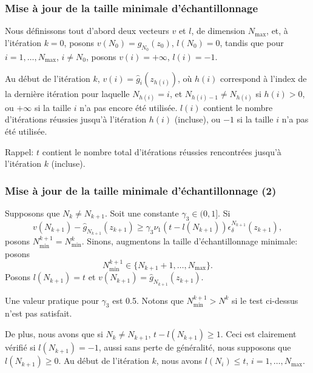 \documentclass[french]{beamer}
\begin{document}
\begin{frame}
\frametitle{Mise à jour de la taille minimale d'échantillonnage}

Nous définissons tout d'abord deux vecteurs $v$ et $l$, de dimension
$N_{\max}$, et, à l'itération $k = 0$, posons $v(N_0) =
\hat{g}_{N_0}(z_0)$, $l(N_0) = 0$, tandis que pour $i =
1,\ldots,N_{\max}$, $i \ne N_0$, posons $v(i) = +\infty$, $l(i) = -1$.

\mbox{}

Au début de l'itération $k$, $v(i) = \hat{g}_i(z_{h(i)})$, où $h(i)$
correspond à l'index de la dernière itération pour laquelle $N_{h(i)} =
i$, et $N_{h(i)-1} \ne N_{h(i)}$ si $h(i) > 0$, ou $+\infty$ si la
taille $i$ n'a pas encore été utilisée.
$l(i)$ contient le nombre d'itérations réussies jusqu'à l'itération
$h(i)$ (incluse), ou $-1$ si la taille $i$ n'a pas été utilisée.

\mbox{}

Rappel: $t$ contient le nombre total d'itérations réussies rencontrées
jusqu'à l'itération $k$ (incluse).

\end{frame}

\begin{frame}
\frametitle{Mise à jour de la taille minimale d'échantillonnage (2)}

Supposons que $N_k \ne N_{k+1}$.
Soit une constante $\gamma_3 \in (0,1]$. Si
\[
v(N_{k+1}) - \hat{g}_{N_{k+1}}(z_{k+1}) \geq
\gamma_3\nu_1(t-l(N_{k+1}))\epsilon_{\delta}^{N_{k+1}}(z_{k+1}),
\]
posons $N_{\min}^{k+1} = N_{\min}^k$.
Sinons, augmentons la taille d'échantillonnage minimale: posons
\[
N^{k+1}_{\min} \in \lbrace N_{k+1}+1,\ldots,N_{\max} \rbrace .
\]
Posons $l(N_{k+1}) = t$ et $v(N_{k+1}) = \hat{g}_{N_{k+1}}(z_{k+1})$.

\mbox{}

Une valeur pratique pour $\gamma_3$ est 0.5.
Notons que $N^{k+1}_{\min} > N^k$ si le test ci-dessus n'est pas
satisfait.

De plus, nous avons que si $N_k \ne N_{k+1}$, $t-l(N_{k+1}) \geq 1$.
Ceci est clairement vérifié si $l(N_{k+1}) = -1$, aussi sans perte de
généralité, nous supposons que $l(N_{k+1}) \geq 0$.
Au début de l'itération $k$, nous avons $l(N_i) \leq t$, $i =
1,\ldots,N_{\max}$.

\end{frame}
\end{document}
